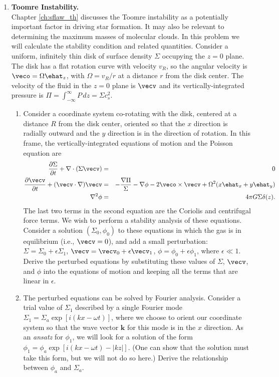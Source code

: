 \documentclass[twoside]{tufte-book} %
\begin{document}
\begin{enumerate}
\item \textbf{Toomre Instability.}\\
Chapter \ref{ch:sflaw_th} discusses the Toomre instability as a potentially important factor in driving star formation. It may also be relevant to determining the maximum masses of molecular clouds. In this problem we will calculate the stability condition and related quantities. Consider a uniform, infinitely thin disk of surface density $\Sigma$ occupying the $z=0$ plane. The disk has a flat rotation curve with velocity $v_R$, so the angular velocity is $\veco=\Omega \ehat_z$, with $\Omega = v_R/r$ at a distance $r$ from the disk center. The velocity of the fluid in the $z=0$ plane is $\vecv$ and its vertically-integrated pressure is $\Pi=\int_{-\infty}^{\infty} P \, dz = \Sigma c_s^2$. 
\begin{enumerate}
\item Consider a coordinate system co-rotating with the disk, centered at a distance $R$ from the disk center, oriented so that the $x$ direction is radially outward and the $y$ direction is in the direction of rotation. In this frame, the vertically-integrated equations of motion and the Poisson equation are
\begin{eqnarray*}
\frac{\partial \Sigma}{\partial t} + \nabla \cdot (\Sigma \vecv) & = & 0 \\
\frac{\partial \vecv}{\partial t} + (\vecv\cdot\nabla)\vecv & = & -\frac{\nabla \Pi}{\Sigma} - \nabla \phi - 2\veco \times \vecv + \Omega^2 (x \ehat_x + y \ehat_y) \\
\nabla^2 \phi & = & 4 \pi G \Sigma \delta(z).
\end{eqnarray*}
The last two terms in the second equation are the Coriolis and centrifugal force terms.
We wish to perform a stability analysis of these equations. Consider a solution $(\Sigma_0, \phi_0)$ to these equations in which the gas is in equilibrium (i.e., $\vecv=0$), and add a small perturbation: $\Sigma=\Sigma_0 + \epsilon \Sigma_1$, $\vecv = \vecv_0 + \epsilon \vecv_1$, $\phi=\phi_0 + \epsilon \phi_1$, where $\epsilon \ll 1$. Derive the perturbed equations by substituting these values of $\Sigma$, $\vecv$, and $\phi$ into the equations of motion and keeping all the terms that are linear in $\epsilon$.
\item The perturbed equations can be solved by Fourier analysis. Consider a trial value of $\Sigma_1$ described by a single Fourier mode $\Sigma_1 = \Sigma_a \exp[i(kx - \omega t)]$, where we choose to orient our coordinate system so that the wave vector $\mathbf{k}$ for this mode is in the $x$ direction. As an {\it ansatz} for $\phi_1$, we will look for a solution of the form $\phi_1 = \phi_a \exp[i(kx - \omega t) - |k z|]$. (One can show that the solution must take this form, but we will not do so here.) Derive the relationship between $\phi_a$ and $\Sigma_a$.

\end{enumerate}
\end{enumerate}
\end{document}
